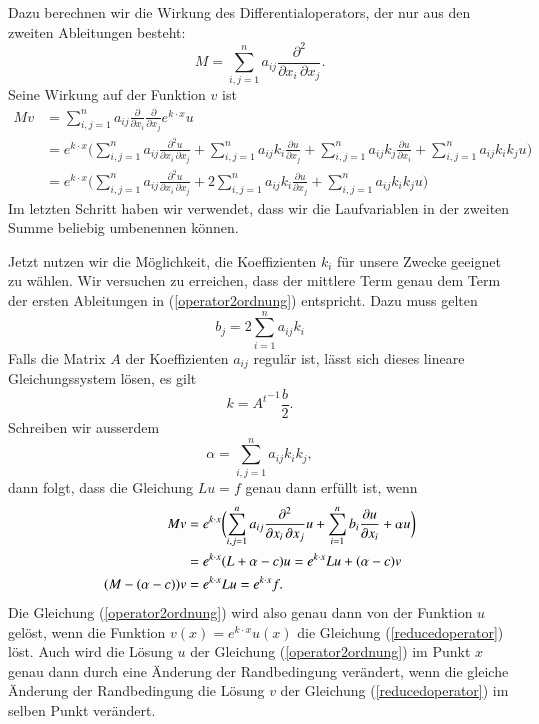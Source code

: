 Dazu berechnen wir die Wirkung des Differentialoperators, der nur 
aus den zweiten Ableitungen besteht:
\[
M=\sum_{i,j=1}^n a_{ij}\frac{\partial^2}{\partial x_i\,\partial x_j}.
\]
Seine Wirkung auf der Funktion $v$ ist
\begin{align*}
Mv
&=
\sum_{i,j=1}^na_{ij}
\frac{\partial}{\partial x_i}
\frac{\partial}{\partial x_j} e^{k\cdot x}u
\\
&=
e^{k\cdot x}
\biggl(
\sum_{i,j=1}^na_{ij}
\frac{\partial^2 u}{\partial x_i\,\partial x_j}
+
\sum_{i,j=1}^n a_{ij}k_i\frac{\partial u}{\partial x_j}
+
\sum_{i,j=1}^n a_{ij}k_j\frac{\partial u}{\partial x_i}
+
\sum_{i,j=1}^n a_{ij}k_ik_ju
\biggr)
\\
&=
e^{k\cdot x}
\biggl(
\sum_{i,j=1}^na_{ij}
\frac{\partial^2 u}{\partial x_i\,\partial x_j}
+
2\sum_{i,j=1}^n a_{ij}k_i\frac{\partial u}{\partial x_j}
+
\sum_{i,j=1}^n a_{ij}k_ik_ju
\biggr)
\end{align*}
Im letzten Schritt haben wir verwendet, dass wir die Laufvariablen
in der zweiten Summe beliebig umbenennen können.

Jetzt nutzen wir die Möglichkeit, die Koeffizienten $k_i$ für unsere
Zwecke geeignet zu wählen.
Wir versuchen zu erreichen, dass der mittlere Term genau dem Term 
der ersten Ableitungen in (\ref{operator2ordnung}) entspricht.
Dazu muss gelten
\begin{equation}
b_j=2\sum_{i=1}^n a_{ij}k_i
\label{bequation}
\end{equation}
Falls die Matrix $A$ der Koeffizienten $a_{ij}$ regulär ist, lässt
sich dieses lineare Gleichungssystem lösen, es gilt
\[
k=
{A^t}^{-1}
\frac{b}2.
\]
Schreiben wir ausserdem
\[
\alpha = \sum_{i,j=1}^n a_{ij}k_ik_j,
\]
dann folgt, dass die Gleichung $Lu=f$ genau dann erfüllt ist, wenn
\begin{align}
Mv
&=
e^{k\cdot x}\biggl(
\sum_{i,j=1}^n a_{ij}\frac{\partial^2}{\partial x_i\,\partial x_j}u
+\sum_{i=1}^n b_i\frac{\partial u}{\partial x_i}+\alpha u
\biggr)
\\
&=
e^{k\cdot x}
(L+\alpha -c)u
=
e^{k\cdot x}Lu + (\alpha -c)v
\notag
\\
(M-(\alpha - c))v&=e^{k\cdot x}Lu=e^{k\cdot x}f.
\label{reducedoperator}
\end{align}
Die Gleichung (\ref{operator2ordnung}) wird also genau dann von der
Funktion $u$ gelöst, wenn die Funktion $v(x)=e^{k\cdot x}u(x)$ 
die Gleichung (\ref{reducedoperator}) löst.
Auch wird die Lösung $u$ der Gleichung (\ref{operator2ordnung})
im Punkt $x$ 
genau dann durch eine Änderung der Randbedingung verändert, 
wenn die gleiche Änderung der Randbedingung die Lösung $v$ 
der Gleichung (\ref{reducedoperator}) im selben Punkt verändert.

